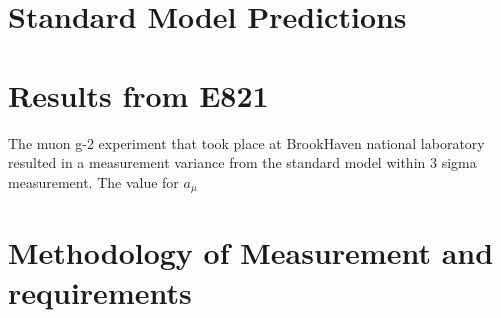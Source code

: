 \documentclass[./Thesis]{subfiles}
\begin{document}
\section{Standard Model Predictions}




\section{Results from E821}

	The muon g-2 experiment that took place at BrookHaven national laboratory resulted in a measurement variance from the standard model within 3 sigma measurement. The value for $a_{\mu}$ 




\section{Methodology of Measurement and requirements}
\end{document}
